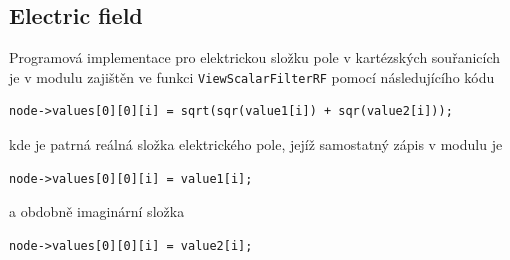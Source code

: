 \subsection*{Electric field}
Programová implementace pro elektrickou složku pole v kartézských souřanicích je v modulu zajištěn ve funkci \texttt{ViewScalarFilterRF} pomocí následujícího kódu
\begin{verbatim}
node->values[0][0][i] = sqrt(sqr(value1[i]) + sqr(value2[i]));
\end{verbatim}
kde je patrná reálná složka elektrického pole, jejíž samostatný zápis v modulu je
\begin{verbatim}
node->values[0][0][i] = value1[i];
\end{verbatim}
a obdobně imaginární složka 
\begin{verbatim}
node->values[0][0][i] = value2[i];
\end{verbatim}

